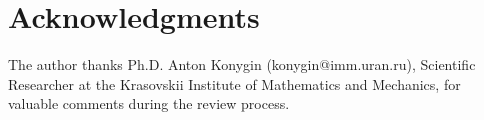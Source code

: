 \section{Acknowledgments}
\hspace{\parindent}
The author thanks Ph.D. Anton Konygin (konygin@imm.uran.ru), Scientific Researcher at the Krasovskii Institute of Mathematics and Mechanics, for valuable comments during the review process.


